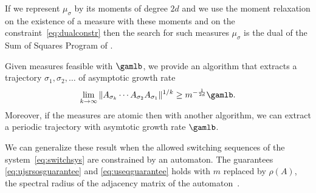 \documentclass{blux2017}
\begin{document}
If we represent $\mu_\sigma$ by its moments of degree $2d$ and we use the moment relaxation on the existence of a measure with these moments and on the constraint~\eqref{eq:dualconstr} then
the search for such measures $\mu_\sigma$ is the dual of the Sum of Squares Program of .

Given measures feasible with $\gamlb$, we provide an algorithm that extracts a trajectory $\sigma_1, \sigma_2, \ldots$ of asymptotic growth rate
\begin{equation}
  \label{eq:useqguarantee}
  \lim_{k \to \infty} \|A_{\sigma_k} \cdots A_{\sigma_2} A_{\sigma_1}\|^{1/k} \geq m^{-\frac{1}{2d}} \gamlb.
\end{equation}
Moreover, if the measures are atomic then with another algorithm, we can extract a periodic trajectory with asymtotic growth rate $\gamlb$.

We can generalize these result when the allowed switching sequences of the system~\eqref{eq:switchsys} are constrained by an automaton.
The guarantees \eqref{eq:ujsrsosguarantee} and \eqref{eq:useqguarantee} holds with $m$ replaced by $\rho(A)$, the spectral radius of the adjacency matrix of the automaton~\cite{philippe2016stability, legat2016generating}.



\end{document}
